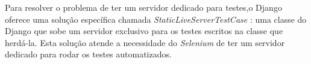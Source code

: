 Para resolver o problema de ter um servidor dedicado para testes,o Django oferece uma solução específica chamada \textit{StaticLiveServerTestCase} \cite{staticfiles2018}: uma classe do Django que sobe um servidor exclusivo para os testes escritos na classe que herdá-la. Esta solução atende a necessidade do \textit{Selenium} de ter um servidor dedicado para rodar os testes automatizados.




